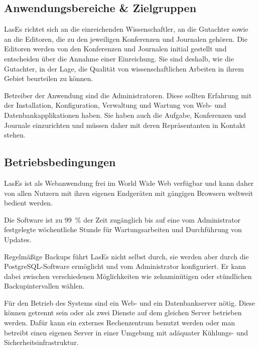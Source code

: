 
\subsection{Anwendungsbereiche \& Zielgruppen}

LasEs richtet sich an die einreichenden Wissenschaftler, an die Gutachter sowie an die Editoren, die zu den jeweiligen Konferenzen und Journalen gehören.
Die Editoren werden von den Konferenzen und Journalen initial gestellt und entscheiden über die Annahme einer Einreichung.
Sie sind deshalb, wie die Gutachter, in der Lage, die Qualität von wissenschaftlichen Arbeiten in ihrem Gebiet beurteilen zu können.

Betreiber der Anwendung sind die Administratoren.
Diese sollten Erfahrung mit der Installation, Konfiguration, Verwaltung und Wartung von Web- und Datenbankapplikationen haben.
Sie haben auch die Aufgabe, Konferenzen und Journale einzurichten und müssen daher mit deren Repräsentanten in Kontakt stehen.

\subsection{Betriebsbedingungen}

LasEs ist als Webanwendung frei im World Wide Web verfügbar und kann daher von allen Nutzern mit ihren eigenen Endgeräten mit gängigen Browsern weltweit bedient werden.

Die Software ist zu 99~\% der Zeit zugänglich bis auf eine vom Administrator festgelegte wöchentliche Stunde für Wartungsarbeiten und Durchführung von Updates.

Regelmäßige Backups führt LasEs nicht selbst durch, sie werden aber durch die PostgreSQL-Software ermöglicht und vom Administrator konfiguriert.
Er kann dabei zwischen verschiedenen Möglichkeiten wie zehnminütigen oder stündlichen Backupintervallen wählen.

Für den Betrieb des Systems sind ein Web- und ein Datenbankserver nötig.
Diese können getrennt sein oder als zwei Dienste auf dem gleichen Server betrieben werden.
Dafür kann ein externes Rechenzentrum benutzt werden oder man betreibt einen eigenen Server in einer Umgebung mit adäquater Kühlungs- und Sicherheitsinfrastruktur.